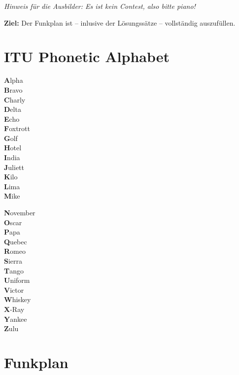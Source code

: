 \documentclass[a4paper,10pt]{article}
\begin{document}
\textit{Hinweis für die Ausbilder: Es ist kein Contest, also bitte piano!}
\bigskip

\textbf{Ziel:} Der Funkplan ist -- inlusive der Lösungssätze -- vollständig
auszufüllen.

\section{ITU Phonetic Alphabet}

\begin{minipage}[t]{0.5\textwidth}
  \large
  \textbf{A}lpha\\
  \textbf{B}ravo\\
  \textbf{C}harly\\
  \textbf{D}elta\\
  \textbf{E}cho\\
  \textbf{F}oxtrott\\
  \textbf{G}olf\\
  \textbf{H}otel\\
  \textbf{I}ndia\\
  \textbf{J}uliett\\
  \textbf{K}ilo\\
  \textbf{L}ima\\
  \textbf{M}ike\\
\end{minipage}
\begin{minipage}[t]{0.5\textwidth}
  \large
  \textbf{N}ovember\\
  \textbf{O}scar\\
  \textbf{P}apa\\
  \textbf{Q}uebec\\
  \textbf{R}omeo\\
  \textbf{S}ierra\\
  \textbf{T}ango\\
  \textbf{U}niform\\
  \textbf{V}ictor\\
  \textbf{W}hiskey\\
  \textbf{X}-Ray\\
  \textbf{Y}ankee\\
  \textbf{Z}ulu\\
\end{minipage}

\clearpage

\section{Funkplan}
\end{document}
